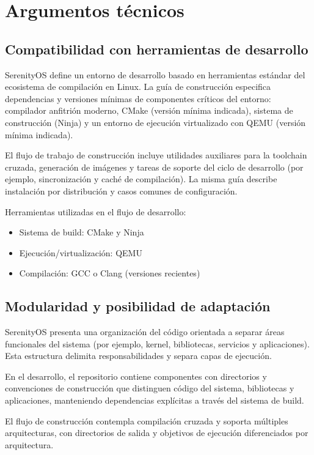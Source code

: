 \section{Argumentos técnicos}
\subsection{Compatibilidad con herramientas de desarrollo}
SerenityOS define un entorno de desarrollo basado en herramientas estándar del ecosistema de compilación en Linux. La guía de construcción especifica dependencias y versiones mínimas de componentes críticos del entorno: compilador anfitrión moderno, CMake (versión mínima indicada), sistema de construcción (Ninja) y un entorno de ejecución virtualizado con QEMU (versión mínima indicada).

El flujo de trabajo de construcción incluye utilidades auxiliares para la toolchain cruzada, generación de imágenes y tareas de soporte del ciclo de desarrollo (por ejemplo, sincronización y caché de compilación). La misma guía describe instalación por distribución y casos comunes de configuración.

Herramientas utilizadas en el flujo de desarrollo:
\begin{itemize}
	\item Sistema de build: CMake y Ninja
	\item Ejecución/virtualización: QEMU
	\item Compilación: GCC o Clang (versiones recientes)
\end{itemize}

\subsection{Modularidad y posibilidad de adaptación}
SerenityOS presenta una organización del código orientada a separar áreas funcionales del sistema (por ejemplo, kernel, bibliotecas, servicios y aplicaciones). Esta estructura delimita responsabilidades y separa capas de ejecución.

En el desarrollo, el repositorio contiene componentes con directorios y convenciones de construcción que distinguen código del sistema, bibliotecas y aplicaciones, manteniendo dependencias explícitas a través del sistema de build.

El flujo de construcción contempla compilación cruzada y soporta múltiples arquitecturas, con directorios de salida y objetivos de ejecución diferenciados por arquitectura.

